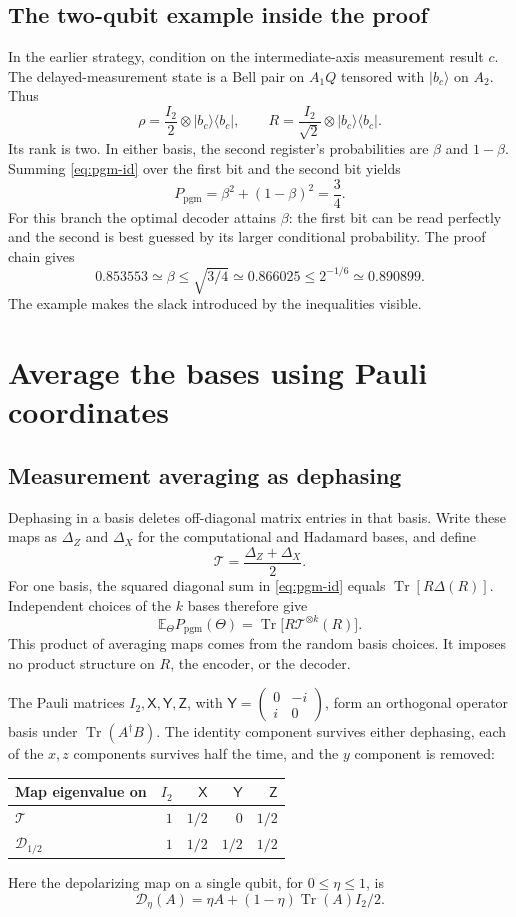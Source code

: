 \documentclass[11pt,a4paper]{article}
\newcommand{\Tr}{\operatorname{Tr}}
\newcommand{\E}{\mathbb E}
\newcommand{\ket}[1]{\lvert #1\rangle}
\newcommand{\bra}[1]{\langle #1\rvert}
\newcommand{\pgm}{P_{\mathrm{pgm}}}
\newcommand{\Dmap}{\mathcal D}
\newcommand{\XX}{\mathsf X}
\newcommand{\YY}{\mathsf Y}
\newcommand{\ZZ}{\mathsf Z}
\newcommand{\newsection}[1]{\section{#1}}
\begin{document}
\subsection{The two-qubit example inside the proof}
In the earlier strategy, condition on the intermediate-axis measurement result $c$. The delayed-measurement state is a Bell pair on $A_1Q$ tensored with $\ket{b_c}$ on $A_2$. Thus
\[
\rho=\frac{I_2}{2}\otimes\ket{b_c}\bra{b_c},\qquad
R=\frac{I_2}{\sqrt2}\otimes\ket{b_c}\bra{b_c}.
\]
Its rank is two. In either basis, the second register's probabilities are $\beta$ and $1-\beta$. Summing \eqref{eq:pgm-id} over the first bit and the second bit yields
\[
\pgm=\beta^2+(1-\beta)^2=\frac34.
\]
For this branch the optimal decoder attains $\beta$: the first bit can be read perfectly and the second is best guessed by its larger conditional probability. The proof chain gives
\[
0.853553\simeq\beta\leq\sqrt{3/4}\simeq0.866025
\leq2^{-1/6}\simeq0.890899.
\]
The example makes the slack introduced by the inequalities visible.

\newsection{Average the bases using Pauli coordinates}
\subsection{Measurement averaging as dephasing}
Dephasing in a basis deletes off-diagonal matrix entries in that basis. Write these maps as $\Delta_Z$ and $\Delta_X$ for the computational and Hadamard bases, and define
\[
\mathcal T=\frac{\Delta_Z+\Delta_X}{2}.
\]
For one basis, the squared diagonal sum in \eqref{eq:pgm-id} equals $\Tr[R\Delta(R)]$. Independent choices of the $k$ bases therefore give
\begin{equation}\label{eq:average}
\E_\Theta\pgm(\Theta)=\Tr\big[R\mathcal T^{\otimes k}(R)\big].
\end{equation}
This product of averaging maps comes from the random basis choices. It imposes no product structure on $R$, the encoder, or the decoder.

The Pauli matrices $I_2,\XX,\YY,\ZZ$, with
$\YY=\left(\begin{smallmatrix}0&-i\\i&0\end{smallmatrix}\right)$, form an orthogonal operator basis under $\Tr(A^\dagger B)$. The identity component survives either dephasing, each of the $x,z$ components survives half the time, and the $y$ component is removed:
\begin{center}\small
\begin{tabular}{@{}lrrrr@{}}\toprule
Map eigenvalue on & $I_2$ & $\XX$ & $\YY$ & $\ZZ$\\\midrule
$\mathcal T$ & $1$ & $1/2$ & $0$ & $1/2$\\
$\Dmap_{1/2}$ & $1$ & $1/2$ & $1/2$ & $1/2$\\\bottomrule
\end{tabular}\end{center}
Here the depolarizing map on a single qubit, for $0\leq\eta\leq1$, is
\[
\Dmap_\eta(A)=\eta A+(1-\eta)\Tr(A)I_2/2.
\]
\end{document}
